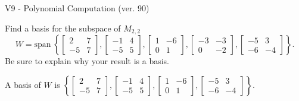 \begin{exercise}
  \begin{exerciseTitle}V9 - Polynomial Computation (ver. 90)\end{exerciseTitle}
  \begin{exerciseStatement}
    Find a basis for the subspace of \(M_{2,2}\) 
\[W=\mathrm{span}\ \left\{\left[\begin{array}{cc}
2 & 7 \\
-5 & 7
\end{array}\right] , \left[\begin{array}{cc}
-1 & 4 \\
-5 & 5
\end{array}\right] , \left[\begin{array}{cc}
1 & -6 \\
0 & 1
\end{array}\right] , \left[\begin{array}{cc}
-3 & -3 \\
0 & -2
\end{array}\right] , \left[\begin{array}{cc}
-5 & 3 \\
-6 & -4
\end{array}\right]\right\}.\]
 Be sure to explain why your result is a basis.


  \end{exerciseStatement}
  \begin{exerciseAnswer}
   A basis of \(W\) is  \(\left\{\left[\begin{array}{cc}
2 & 7 \\
-5 & 7
\end{array}\right] , \left[\begin{array}{cc}
-1 & 4 \\
-5 & 5
\end{array}\right] , \left[\begin{array}{cc}
1 & -6 \\
0 & 1
\end{array}\right] , \left[\begin{array}{cc}
-5 & 3 \\
-6 & -4
\end{array}\right]\right\}\).
  


  \end{exerciseAnswer}
\end{exercise}